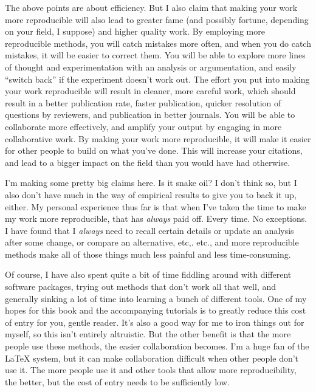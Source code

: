 \documentclass{book}
\begin{document}
The above points are about efficiency. But I also claim that making your work more reproducible will also lead to greater fame (and possibly fortune, depending on your field, I suppose) and higher quality work.  By employing more reproducible methods, you will catch mistakes more often, and when you do catch mistakes, it will be easier to correct them. You will be able to explore more lines of thought and experimentation with an analysis or argumentation, and easily ``switch back'' if the experiment doesn't work out. The effort you put into making your work reproducible will result in cleaner, more careful work, which should result in a better publication rate, faster publication, quicker resolution of questions by reviewers, and publication in better journals. You will be able to collaborate more effectively, and amplify your output by engaging in more collaborative work.  By making your work more reproducible, it will make it easier for other people to build on what you've done. This will increase your citations, and lead to a bigger impact on the field than you would have had otherwise.

I'm making some pretty big claims here.  Is it snake oil?  I don't think so, but I also don't have much in the way of empirical results to give you to back it up, either. My personal experience thus far is that when I've taken the time to make my work more reproducible, that has \emph{always} paid off.  Every time.  No exceptions.  I have found that I \emph{always} need to recall certain details or update an analysis after some change, or compare an alternative, etc,. etc., and more reproducible methods make all of those things much less painful and less time-consuming.

Of course, I have also spent quite a bit of time fiddling around with different software packages, trying out methods that don't work all that well, and generally sinking a lot of time into learning a bunch of different tools.  One of my hopes for this book and the accompanying tutorials is to greatly reduce this cost of entry for you, gentle reader.  It's also a good way for me to iron things out for myself, so this isn't entirely altruistic. But the other benefit is that the more people use these methods, the easier collaboration becomes.  I'm a huge fan of the \LaTeX{} system, but it can make collaboration difficult when other people don't use it.  The more people use it and other tools that allow more reproducibility, the better, but the cost of entry needs to be sufficiently low.
\end{document}
